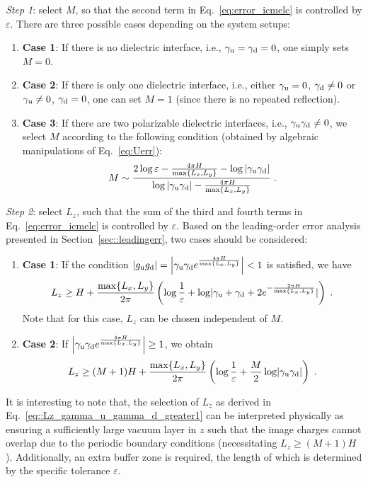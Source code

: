 \emph{Step 1}: select $M$, so that the second term in Eq.~\eqref{eq:error_icmelc} is controlled by $\varepsilon$. 
There are three possible cases depending on the system setups:
\begin{enumerate}
    \item \textbf{Case 1}: If there is no dielectric interface, i.e., $\gamma_{\text{u}}=\gamma_{\text{d}}=0$, one simply sets $M=0$.
    \item \textbf{Case 2}: If there is only one dielectric interface, i.e., either $\gamma_{\text{u}}=0$,$~\gamma_{\text{d}}\neq 0$ or $\gamma_{\text{u}}\neq 0$,$~\gamma_{\text{d}}=0$, one can set $M=1$ (since there is no repeated reflection).
    \item \textbf{Case 3}: If there are two polarizable dielectric interfaces, i.e., $\gamma_{\text{u}}\gamma_{\text{d}}\neq 0$, we select $M$ according to the following condition (obtained by algebraic manipulations of Eq.~\eqref{eq:Uerr}):
    \begin{equation}\label{eq::38}
    M\sim \frac{2\log \varepsilon - \frac{4\pi H}{\max\{L_x,L_y\}} - \log|\gamma_{\text{u}} \gamma_{\text{d}}|}{\log|\gamma_{\text{u}} \gamma_{\text{d}}| - \frac{4\pi H}{\max\{L_x,L_y\}}}\;.
\end{equation}
\end{enumerate}

\emph{Step 2}: select $L_z$, such that the sum of the third and fourth terms in Eq.~\eqref{eq:error_icmelc} is controlled by $\varepsilon$. 
Based on the leading-order error analysis presented in Section~\ref{sec::leadingerr}, two cases should be considered: 
\begin{enumerate}
    \item \textbf{Case 1}: If the condition $|g_{\text{u}}g_{\text{d}}|=\left|\gamma_{\text{u}}\gamma_{\text{d}}e^{\frac{4\pi H}{\max\{L_x,L_y\}}}\right|<1$
is satisfied, we have
\begin{equation}\label{eq::Lz_gamma_u_gamma_d_less1}
    L_z \geq H + \frac{\max\{L_x,L_y\}}{2\pi} \left( \log\frac{1}{\varepsilon} + \log \lvert\gamma_{\text{u}} + \gamma_{\text{d}} + 2e^{- \frac{2\pi H}{\max\{L_x,L_y\}}}\rvert \right)\;.
\end{equation}
Note that for this case, $L_z$ can be chosen independent of $M$.
\item \textbf{Case 2}: If $\left|\gamma_{\text{u}}\gamma_{\text{d}}e^{\frac{4\pi H}{\max\{L_x,L_y\}}}\right|\geq 1$, we obtain
\begin{equation}\label{eq::Lz_gamma_u_gamma_d_greater1}
    L_z \geq (M + 1) H + \frac{\max\{L_x,L_y\}}{2\pi} \left( \log\frac{1}{\varepsilon} + \frac{M}{2}\log \lvert\gamma_{\text{u}} \gamma_{\text{d}}\rvert \right)\;.
\end{equation}
\end{enumerate}
It is interesting to note that, the selection of $L_z$ as derived in Eq.~\eqref{eq::Lz_gamma_u_gamma_d_greater1} can be interpreted physically as ensuring a sufficiently large vacuum layer in $z$ such that the image charges cannot overlap due to the periodic boundary conditions (necessitating $L_z\geq (M+1)H$). Additionally, an extra buffer zone is required, the length of which is determined by the specific tolerance $\varepsilon$.

